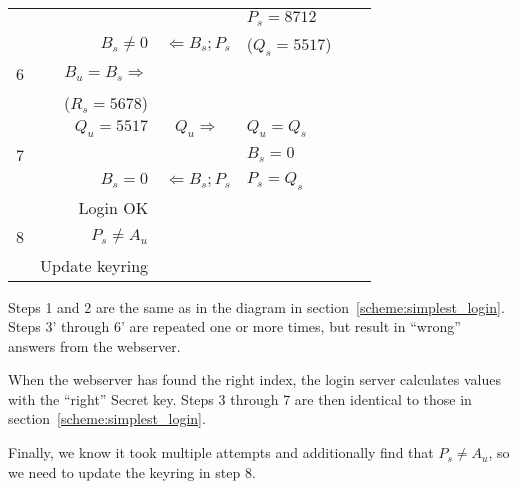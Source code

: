 \begin{table}[H]
\begin{tabular}{|l|r|c|l|c|l|}
  & & & $P_s=8712$ & & \\
  & $B_s\neq0$ & $\Longleftarrow B_s ; P_s $ & ($Q_s=5517$) & & \\
\hline
6 & $B_u=B_s\Rightarrow$ & & & & \\
  & ($R_s=5678$) & & & & \\
  & $Q_u=5517$ & $Q_u \Longrightarrow$ & $Q_u=Q_s$ & & \\
\hline
\hline
7 & & & $B_s=0$ & & \\
  & $B_s=0$ & $\Longleftarrow B_s ; P_s$ & $P_s=Q_s$ & & \\
  & Login OK & & & & \\
\hline
8 & $P_s\neq A_u$ &  & & & \\
  & Update keyring & & & & \\
\hline
\end{tabular}
\end{table}
\par
Steps 1 and 2 are the same as in the diagram in section~\vref{scheme:simplest_login}.
Steps 3' through 6' are repeated one or more times, but result in ``wrong'' answers from the webserver.
\par
When the webserver has found the right index,
the login server calculates values with the ``right'' Secret key.
Steps 3 through 7 are then identical to those in section~\vref{scheme:simplest_login}.
\par
Finally,
we know it took multiple attempts and additionally find that $P_s\neq A_u$,
so we need to update the keyring in step 8.
